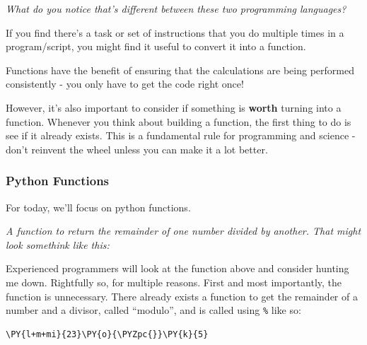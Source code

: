 \emph{What do you notice that's different between these two programming
languages?}

If you find there's a task or set of instructions that you do multiple
times in a program/script, you might find it useful to convert it into a
function.

Functions have the benefit of ensuring that the calculations are being
performed consistently - you only have to get the code right once!

However, it's also important to consider if something is \textbf{worth}
turning into a function. Whenever you think about building a function,
the first thing to do is see if it already exists. This is a fundamental
rule for programming and science - don't reinvent the wheel unless you
can make it a lot better.

\hypertarget{python-functions}{%
\subsubsection{Python Functions}\label{python-functions}}

For today, we'll focus on python functions.

    \emph{A function to return the remainder of one number divided by
another. That might look somethink like this:}

\begin{Shaded}
\begin{Highlighting}[]
    \OperatorTok{\textgreater{}}
        \OperatorTok{{-}}
    \NormalTok{:}
\end{Highlighting}
\end{Shaded}

Experienced programmers will look at the function above and consider
hunting me down. Rightfully so, for multiple reasons. First and most
importantly, the function is unnecessary. There already exists a
function to get the remainder of a number and a divisor, called
``modulo'', and is called using \texttt{\%} like so:

    \begin{tcolorbox}[breakable, size=fbox, boxrule=1pt, pad at break*=1mm,colback=cellbackground, colframe=cellborder]
\begin{Verbatim}[commandchars=\\\{\}]
\PY{l+m+mi}{23}\PY{o}{\PYZpc{}}\PY{k}{5}
\end{Verbatim}
\end{tcolorbox}

